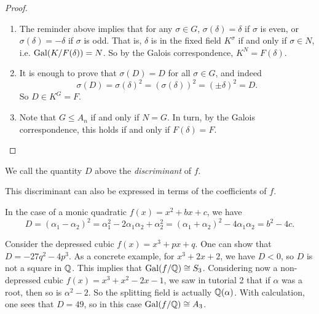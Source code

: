 \begin{proof}~
    \begin{enumerate}[label=(\alph*)]
        \item The reminder above implies that for any $\sigma \in G$, $\sigma(\delta) = \delta$ if $\sigma$ is even, or $\sigma(\delta) = -\delta$ if $\sigma$ is odd. That is, $\delta$ is in the fixed field $K^\sigma$ if and only if $\sigma \in N$, i.e. $\operatorname{Gal}(K/F(\delta)) = N$. So by the Galois correspondence, $K^N = F(\delta)$.
        \item It is enough to prove that $\sigma(D) = D$ for all $\sigma \in G$, and indeed
        \[
            \sigma(D) = \sigma(\delta)^2 = (\sigma(\delta))^2 = (\pm \delta)^2 = D.
        \]
        So $D \in K^G = F$.
        
        \item Note that $G \leq A_n$ if and only if $N = G$. In turn, by the Galois correspondence, this holds if and only if $F(\delta) = F$. \qedhere
    \end{enumerate}
\end{proof}

\begin{definition}
    We call the quantity $D$ above the \emph{discriminant} of $f$.
\end{definition}

This discriminant can also be expressed in terms of the coefficients of $f$.

\begin{example}
    In the case of a monic quadratic $f(x) = x^2 + bx + c$, we have
    \[
        D = (\alpha_1 - \alpha_2)^2 = \alpha_1^2 - 2\alpha_1 \alpha_2 + \alpha_2^2 = (\alpha_1 + \alpha_2)^2 - 4 \alpha_1 \alpha_2 = b^2 - 4c.
    \]
\end{example}

\begin{example}
    Consider the depressed cubic $f(x) = x^3 + px + q$. One can show that $D = -27q^2 - 4p^3$. As a concrete example, for $x^3 + 2x + 2$, we have $D < 0$, so $D$ is not a square in $\mathbb{{Q}}$. This implies that $\operatorname{Gal}(f/\mathbb{{Q}}) \cong S_3$. Considering now a non-depressed cubic $f(x) = x^3 + x^2 - 2x - 1$, we saw in tutorial 2 that if $\alpha$ was a root, then so is $\alpha^2 - 2$. So the splitting field is actually $\mathbb{{Q}}(\alpha)$. With calculation, one sees that $D = 49$, so in this case $\operatorname{Gal}(f/\mathbb{{Q}}) \cong A_3$.
\end{example}
